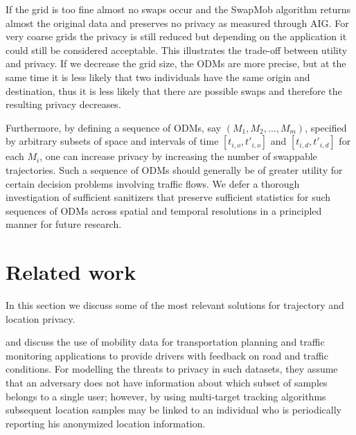 \documentclass[times,twocolumn,final,authoryear]{elsarticle}
\begin{document}
If the grid is too fine almost no swaps occur
and the SwapMob algorithm returns almost the original data and preserves no privacy as measured through AIG. 
For very coarse grids the privacy is still reduced but depending on the application it could still
be considered acceptable. 
{\color{blue} This illustrates the trade-off between utility and privacy. If we decrease the grid size, the ODMs are more precise, but at the same time it is less likely that two individuals have the same origin and destination, thus it is less likely that there are possible swaps and therefore the resulting privacy decreases.
}

Furthermore, by defining a sequence of ODMs, say $(M_1,M_2,\ldots,M_m)$, specified by arbitrary subsets of space 
and intervals of time $[t_{i,o},t'_{i,o}]$ and $[t_{i,d},t'_{i,d}]$ for each $M_i$, one can increase privacy by increasing the number of swappable trajectories. Such a sequence of ODMs should generally be of greater utility for certain decision problems involving traffic flows. We defer a thorough investigation of sufficient sanitizers that preserve sufficient statistics for such sequences of ODMs across spatial and temporal resolutions in a principled manner for future research.  

\section{Related work}
{\color{blue} In this section we discuss some of the most relevant solutions for trajectory and location privacy.
}
%
%
%

\cite{Hoh2005} and \cite{Hoh06} discuss the use of mobility data for transportation planning and traffic monitoring applications to provide drivers with feedback on road and traffic conditions.
For modelling the threats to privacy in such datasets, they assume that an adversary does not have information about which subset of samples belongs to a single user; 
however, by using multi-target tracking algorithms \citep{Reid79analgorithm} subsequent location samples may be linked to an individual who is periodically reporting his anonymized location information.
\end{document}
